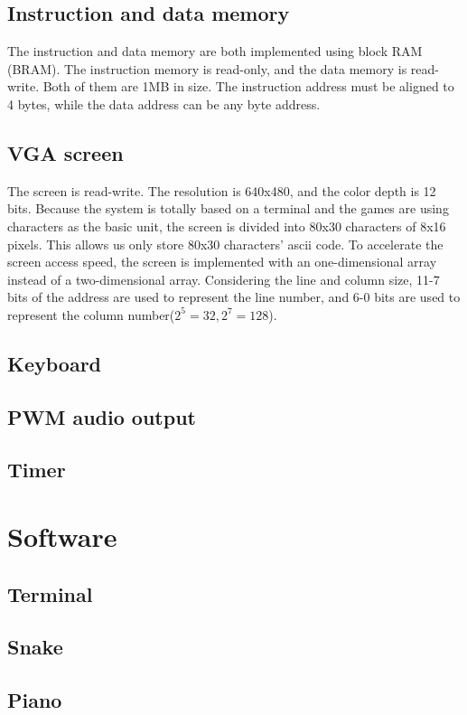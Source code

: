 \documentclass[12pt, a4paper, oneside]{article}
\begin{document}
\subsection{Instruction and data memory}
The instruction and data memory are both implemented using block RAM (BRAM). The instruction memory is read-only, and the data memory is read-write. Both of them are 1MB in size. The instruction address must be aligned to 4 bytes, while the data address can be any byte address.
\subsection{VGA screen}
The screen is read-write. The resolution is 640x480, and the color depth is 12 bits. Because the system is totally based on a terminal and the games are using characters as the basic unit, the screen is divided into 80x30 characters of 8x16 pixels. This allows us only store 80x30 characters' ascii code. To accelerate the screen access speed, the screen is implemented with an one-dimensional array instead of a two-dimensional array. Considering the line and column size, 11-7 bits of the address are used to represent the line number, and 6-0 bits are used to represent the column number($2^5=32,2^7=128$).
\subsection{Keyboard}

\subsection{PWM audio output}

\subsection{Timer}

\section{Software}
\subsection{Terminal}
\subsection{Snake}
\subsection{Piano}
\end{document}
